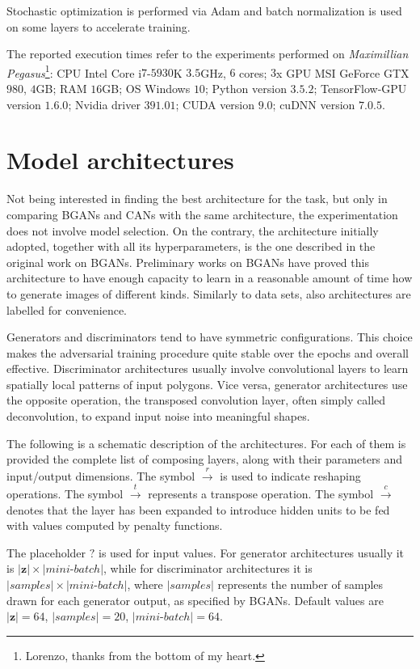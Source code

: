 Stochastic optimization is performed via Adam \cite{adam} and batch normalization \cite{batch_norm} is used on some layers to accelerate training.

The reported execution times refer to the experiments performed on \textit{Maximillian Pegasus}\footnote{Lorenzo, thanks from the bottom of my heart.}: CPU Intel Core i$7$-$5930$K $3.5$GHz, $6$ cores; $3$x GPU MSI GeForce GTX $980$, $4$GB; RAM $16$GB; OS Windows $10$; Python version $3.5.2$; TensorFlow-GPU version $1.6.0$; Nvidia driver $391.01$; CUDA version $9.0$; cuDNN version $7.0.5$.


\section{Model architectures}

Not being interested in finding the best architecture for the task, but only in comparing BGANs and CANs with the same architecture, the experimentation does not involve model selection. On the contrary, the architecture initially adopted, together with all its hyperparameters, is the one described in the original work on BGANs. Preliminary works on BGANs have proved this architecture to have enough capacity to learn in a reasonable amount of time how to generate images of different kinds. Similarly to data sets, also architectures are labelled for convenience.

Generators and discriminators tend to have symmetric configurations. This choice makes the adversarial training procedure quite stable over the epochs and overall effective. Discriminator architectures usually involve convolutional layers to learn spatially local patterns of input polygons. Vice versa, generator architectures use the opposite operation, the transposed convolution layer, often simply called deconvolution, to expand input noise into meaningful shapes.

The following is a schematic description of the architectures. For each of them is provided the complete list of composing layers, along with their parameters and input/output dimensions. The symbol $\stackrel{r}{\to}$ is used to indicate reshaping operations. The symbol $\stackrel{t}{\to}$ represents a transpose operation. The symbol $\stackrel{c}{\to}$ denotes that the layer has been expanded to introduce hidden units to be fed with values computed by penalty functions.

The placeholder $?$ is used for input values. For generator architectures usually it is $|\bm{z}| \times |mini\text{-}batch|$, while for discriminator architectures it is $|samples| \times |mini\text{-}batch|$, where $|samples|$ represents the number of samples drawn for each generator output, as specified by BGANs. Default values are $|\bm{z}| = 64$, $|samples| = 20$, $|mini\text{-}batch| = 64$.


